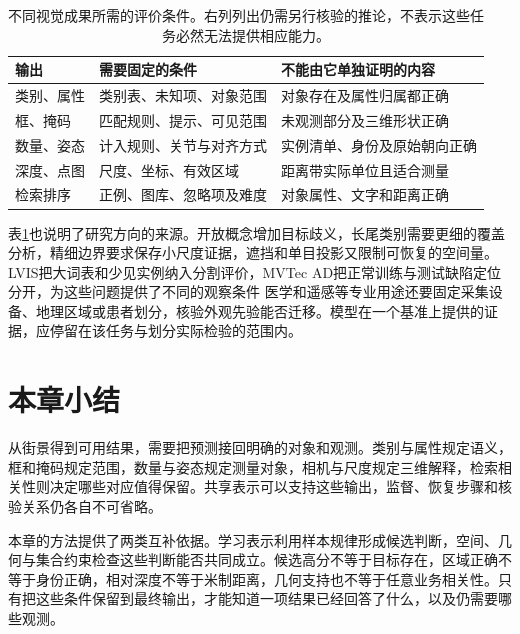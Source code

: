 \begin{table}[htbp]
 \centering
 \small
 \begin{tabularx}{\linewidth}{@{}lXX@{}}
 \toprule
 输出 & 需要固定的条件 & 不能由它单独证明的内容\\
 \midrule
 类别、属性 & 类别表、未知项、对象范围 & 对象存在及属性归属都正确\\
 框、掩码 & 匹配规则、提示、可见范围 & 未观测部分及三维形状正确\\
 数量、姿态 & 计入规则、关节与对齐方式 & 实例清单、身份及原始朝向正确\\
 深度、点图 & 尺度、坐标、有效区域 & 距离带实际单位且适合测量\\
 检索排序 & 正例、图库、忽略项及难度 & 对象属性、文字和距离正确\\
 \bottomrule
 \end{tabularx}
 \caption{不同视觉成果所需的评价条件。右列列出仍需另行核验的推论，不表示这些任务必然无法提供相应能力。}
 \label{tab:vision-recognition-protocols}
\end{table}

\Needspace{95mm}
表\ref{tab:vision-recognition-protocols}也说明了研究方向的来源。开放概念增加目标歧义，长尾类别需要更细的覆盖分析，精细边界要求保存小尺度证据，遮挡和单目投影又限制可恢复的空间量。LVIS把大词表和少见实例纳入分割评价，MVTec AD把正常训练与测试缺陷定位分开，为这些问题提供了不同的观察条件
医学和遥感等专业用途还要固定采集设备、地理区域或患者划分，核验外观先验能否迁移。模型在一个基准上提供的证据，应停留在该任务与划分实际检验的范围内。

\section{本章小结}
\label{sec:vision-recognition-summary}

从街景得到可用结果，需要把预测接回明确的对象和观测。类别与属性规定语义，框和掩码规定范围，数量与姿态规定测量对象，相机与尺度规定三维解释，检索相关性则决定哪些对应值得保留。共享表示可以支持这些输出，监督、恢复步骤和核验关系仍各自不可省略。

本章的方法提供了两类互补依据。学习表示利用样本规律形成候选判断，空间、几何与集合约束检查这些判断能否共同成立。候选高分不等于目标存在，区域正确不等于身份正确，相对深度不等于米制距离，几何支持也不等于任意业务相关性。只有把这些条件保留到最终输出，才能知道一项结果已经回答了什么，以及仍需要哪些观测。
